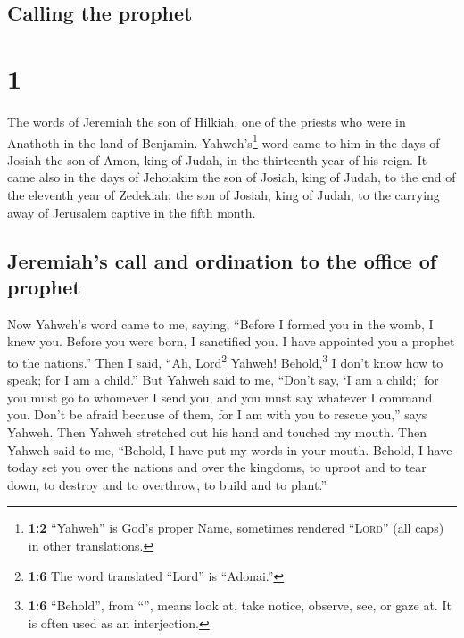 \hypertarget{calling-the-prophet}{%
\subsection{Calling the prophet}\label{calling-the-prophet}}

\hypertarget{section}{%
\section{1}\label{section}}

 The words of Jeremiah the son of Hilkiah, one of the
priests who were in Anathoth in the land of Benjamin. 
Yahweh's\footnote{\textbf{1:2} ``Yahweh'' is God's proper Name,
  sometimes rendered ``\textsc{Lord}'' (all caps) in other translations.}
word came to him in the days of Josiah the son of Amon, king of Judah,
in the thirteenth year of his reign.  It came also in the
days of Jehoiakim the son of Josiah, king of Judah, to the end of the
eleventh year of Zedekiah, the son of Josiah, king of Judah, to the
carrying away of Jerusalem captive in the fifth month.

\hypertarget{jeremiahs-call-and-ordination-to-the-office-of-prophet}{%
\subsection{Jeremiah's call and ordination to the office of
prophet}\label{jeremiahs-call-and-ordination-to-the-office-of-prophet}}

 Now Yahweh's word came to me, saying, 
``Before I formed you in the womb, I knew you. Before you were born, I
sanctified you. I have appointed you a prophet to the nations.''
 Then I said, ``Ah, Lord\footnote{\textbf{1:6} The word
  translated ``Lord'' is ``Adonai.''} Yahweh! Behold,\footnote{\textbf{1:6}
  ``Behold'', from ``'', means look at, take notice,
  observe, see, or gaze at. It is often used as an interjection.} I
don't know how to speak; for I am a child.''  But Yahweh
said to me, ``Don't say, `I am a child;' for you must go to whomever I
send you, and you must say whatever I command you.  Don't
be afraid because of them, for I am with you to rescue you,'' says
Yahweh.  Then Yahweh stretched out his hand and touched my
mouth. Then Yahweh said to me, ``Behold, I have put my words in your
mouth.  Behold, I have today set you over the nations and
over the kingdoms, to uproot and to tear down, to destroy and to
overthrow, to build and to plant.''

